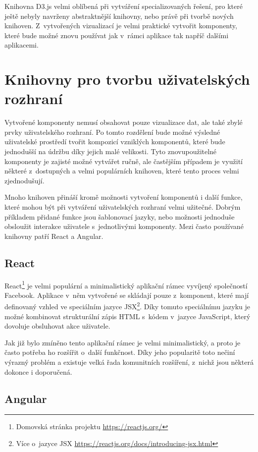 Knihovna D3.js velmi oblíbená při vytváření specializovaných řešení, pro které ještě nebyly navrženy abstraktnější knihovny, nebo právě při tvorbě nových knihoven. Z~vytvořených vizualizací je velmi praktické vytvořit komponenty, které bude možné znovu používat jak v~rámci aplikace tak napříč dalšími aplikacemi.

\section{Knihovny pro tvorbu uživatelských rozhraní}
Vytvořené komponenty nemusí obsahovat pouze vizualizace dat, ale také zbylé prvky uživatelského rozhraní. Po tomto rozdělení bude možné výsledné uživatelské prostředí tvořit kompozicí vzniklých komponentů, které bude jednodušší na údržbu díky jejich malé velikosti. Tyto znovupoužitelné komponenty je zajisté možné vytvářet ručně, ale častějším případem je využití některé z~dostupných a velmi populárních knihoven, které tento proces velmi zjednodušují.

Mnoho knihoven přináší kromě možnosti vytvoření komponentů i další funkce, které mohou být při vytváření uživatelských rozhraní velmi užitečné. Dobrým příkladem přidané funkce jsou šablonovací jazyky, nebo možnosti jednoduše obsloužit interakce uživatele s~jednotlivými komponenty. Mezi často používané knihovny patří React a Angular.

\subsection*{React}
React\footnote{Domovská stránka projektu \url{https://reactjs.org/}} je velmi populární a minimalistický aplikační rámec vyvíjený společností Facebook. Aplikace v~něm vytvořené se skládají pouze z~komponent, které mají definovaný vzhled ve speciálním jazyce JSX\footnote{Více o~jazyce JSX \url{https://reactjs.org/docs/introducing-jsx.html}}. Díky tomuto speciálnímu jazyku je možné kombinovat strukturální zápis HTML s~kódem v~jazyce JavaScript, který dovoluje obsluhovat akce uživatele. 

Jak již bylo zmíněno tento aplikační rámec je velmi minimalistický, a proto je často potřeba ho rozšířit o~další funkčnost. Díky jeho popularitě toto nečiní výrazný problém a existuje velká řada komunitních rozšíření, z~nichž jsou některá dokonce i doporučená.

\subsection*{Angular}

